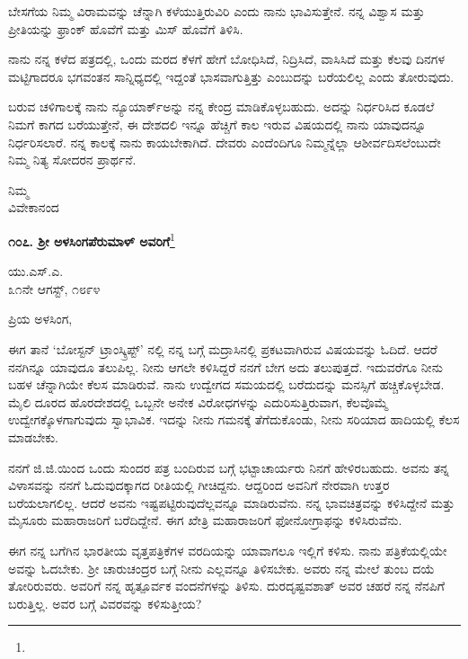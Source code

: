 ಬೇಸಗೆಯ ನಿಮ್ಮ ವಿರಾಮವನ್ನು ಚೆನ್ನಾಗಿ ಕಳೆಯುತ್ತಿರುವಿರಿ ಎಂದು ನಾನು ಭಾವಿಸು\break ತ್ತೇನೆ. ನನ್ನ ವಿಶ್ವಾಸ ಮತ್ತು ಪ್ರೀತಿಯನ್ನು ಫ್ರಾಂಕ್ ಹೊವೆಗೆ ಮತ್ತು ಮಿಸ್ ಹೊವೆಗೆ ತಿಳಿಸಿ.

ನಾನು ನನ್ನ ಕಳೆದ ಪತ್ರದಲ್ಲಿ, ಒಂದು ಮರದ ಕೆಳಗೆ ಹೇಗೆ ಬೋಧಿಸಿದೆ, ನಿದ್ರಿಸಿದೆ, ವಾಸಿಸಿದೆ ಮತ್ತು ಕೆಲವು ದಿನಗಳ ಮಟ್ಟಿಗಾದರೂ ಭಗವಂತನ ಸಾನ್ನಿಧ್ಯದಲ್ಲಿ ಇದ್ದಂತೆ ಭಾಸವಾಗುತ್ತಿತ್ತು ಎಂಬುದನ್ನು ಬರೆಯಲಿಲ್ಲ ಎಂದು ತೋರುವುದು.

ಬರುವ ಚಳಿಗಾಲಕ್ಕೆ ನಾನು ನ್ಯೂಯಾರ್ಕ್‌ಅನ್ನು ನನ್ನ ಕೇಂದ್ರ ಮಾಡಿಕೊಳ್ಳಬಹುದು. ಅದನ್ನು ನಿರ್ಧರಿಸಿದ ಕೂಡಲೆ ನಿಮಗೆ ಕಾಗದ ಬರೆಯುತ್ತೇನೆ, ಈ ದೇಶದಲಿ ಇನ್ನೂ ಹೆಚ್ಚಿಗೆ ಕಾಲ ಇರುವ ವಿಷಯದಲ್ಲಿ ನಾನು ಯಾವುದನ್ನೂ ನಿರ್ಧರಿಸಲಾರೆ. ನನ್ನ ಕಾಲಕ್ಕೆ ನಾನು ಕಾಯಬೇಕಾಗಿದೆ. ದೇವರು ಎಂದೆಂದಿಗೂ ನಿಮ್ಮನ್ನೆಲ್ಲಾ ಆಶೀರ್ವದಿಸಲೆಂಬುದೇ ನಿಮ್ಮ ನಿತ್ಯ ಸೋದರನ ಪ್ರಾರ್ಥನೆ.

{\flushright
ನಿಮ್ಮ\\ವಿವೇಕಾನಂದ\par}

\begin{center}
\textbf{೧೦೭. ಶ‍್ರೀ ಅಳಸಿಂಗಪೆರುಮಾಳ್ ಅವರಿಗೆ}\footnote{}
\end{center}

\begin{flushright}
ಯು.ಎಸ್.ಎ.\\೩೧ನೇ ಆಗಸ್ಟ್, ೧೮೯೪
\end{flushright}

\noindent
ಪ್ರಿಯ ಅಳಸಿಂಗ,

ಈಗ ತಾನೆ `ಬೋಸ್ಟನ್ ಟ್ರಾಂಸ್ಕ್ರಿಪ್ಟ್' ನಲ್ಲಿ ನನ್ನ ಬಗ್ಗೆ ಮದ್ರಾಸಿನಲ್ಲಿ ಪ್ರಕಟವಾಗಿರುವ ವಿಷಯವನ್ನು ಓದಿದೆ. ಆದರೆ ನನಗಿನ್ನೂ ಯಾವುದೂ ತಲುಪಿಲ್ಲ. ನೀನು ಆಗಲೇ ಕಳಿಸಿದ್ದರೆ ನನಗೆ ಬೇಗ ಅದು ತಲುಪುತ್ತದೆ. ಇದುವರೆಗೂ ನೀನು ಬಹಳ ಚೆನ್ನಾಗಿಯೇ ಕೆಲಸ ಮಾಡಿರುವೆ. ನಾನು ಉದ್ವೇಗದ ಸಮಯದಲ್ಲಿ ಬರೆದುದನ್ನು ಮನಸ್ಸಿಗೆ ಹಚ್ಚಿಕೊಳ್ಳಬೇಡ.  ಮೈಲಿ ದೂರದ ಹೊರದೇಶದಲ್ಲಿ ಒಬ್ಬನೇ ಅನೇಕ ವಿರೋಧಗಳನ್ನು ಎದುರಿಸುತ್ತಿರುವಾಗ, ಕೆಲವೊಮ್ಮೆ ಉದ್ವೇಗಕ್ಕೊಳಗಾಗುವುದು ಸ್ವಾಭಾವಿಕ. ಇದನ್ನು ನೀನು ಗಮನಕ್ಕೆ ತೆಗೆದುಕೊಂಡು, ನೀನು ಸರಿಯಾದ ಹಾದಿಯಲ್ಲಿ ಕೆಲಸ ಮಾಡಬೇಕು.

\vspace{0.2cm}

ನನಗೆ ಜಿ.ಜಿ.ಯಿಂದ ಒಂದು ಸುಂದರ ಪತ್ರ ಬಂದಿರುವ ಬಗ್ಗೆ ಭಟ್ಟಾಚಾರ್ಯರು ನಿನಗೆ ಹೇಳಿರಬಹುದು. ಅವನು ತನ್ನ ವಿಳಾಸವನ್ನು ನನಗೆ ಓದುವುದಕ್ಕಾಗದ ರೀತಿಯಲ್ಲಿ ಗೀಚಿದ್ದನು. ಆದ್ದರಿಂದ ಅವನಿಗೆ ನೇರವಾಗಿ ಉತ್ತರ ಬರೆಯಲಾಗಲಿಲ್ಲ. ಆದರೆ ಅವನು ಇಷ್ಟಪಟ್ಟಿರುವುದೆಲ್ಲವನ್ನೂ ಮಾಡಿರುವೆನು. ನನ್ನ ಭಾವಚಿತ್ರವನ್ನು ಕಳಿಸಿದ್ದೇನೆ ಮತ್ತು ಮೈಸೂರು ಮಹಾರಾಜರಿಗೆ ಬರೆದಿದ್ದೇನೆ. ಈಗ ಖೇತ್ರಿ ಮಹಾರಾಜರಿಗೆ ಫೋನೋಗ್ರಾಫನ್ನು ಕಳಿಸಿರುವೆನು.

\vspace{0.2cm}

ಈಗ ನನ್ನ ಬಗೆಗಿನ ಭಾರತೀಯ ವೃತ್ತಪತ್ರಿಕೆಗಳ ವರದಿಯನ್ನು ಯಾವಾಗಲೂ ಇಲ್ಲಿಗೆ ಕಳಿಸು. ನಾನು ಪತ್ರಿಕೆಯಲ್ಲಿಯೇ ಅವನ್ನು ಓದಬೇಕು. ಶ‍್ರೀ ಚಾರುಚಂದ್ರರ ಬಗ್ಗೆ ನೀನು ಎಲ್ಲವನ್ನೂ ತಿಳಿಸಬೇಕು. ಅವರು ನನ್ನ ಮೇಲೆ ತುಂಬ ದಯೆ ತೋರಿರುವರು. ಅವರಿಗೆ ನನ್ನ ಹೃತ್ಪೂರ್ವಕ ವಂದನೆಗಳನ್ನು ತಿಳಿಸು. ದುರದೃಷ್ಟವಶಾತ್ ಅವರ ಚಹರೆ ನನ್ನ ನೆನಪಿಗೆ ಬರುತ್ತಿಲ್ಲ. ಅವರ ಬಗ್ಗೆ ವಿವರವನ್ನು ಕಳಿಸುತ್ತೀಯ?

